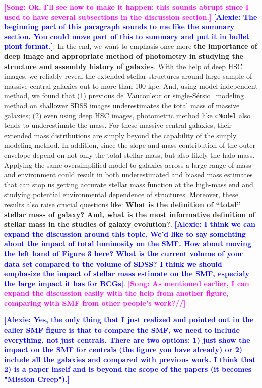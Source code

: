 \documentclass{emulateapj}
\def\ser{{S\'{e}rsic\ }}
\def\cmodel{\texttt{cModel}}
\newcommand{\song}[1]{\textcolor{magenta}{\textbf{[Song: #1]}}}
\newcommand{\alexie}[1]{\textcolor{blue}{\textbf{[Alexie: #1]}}}
\begin{document}
\begin{CJK*}{UTF8}{gbsn}
    \song{Ok, I'll see how to make it happen; this sounds abrupt since I used 
    to have several subsections in the discussion section.}
    \alexie{The beginning part of this paragraph sounds to me like the summary section. You could move part of this to summary and put it in bullet piont format.}. In the end, we want to emphasis once more \textbf{the importance of deep image 
    and appropriate method of photometry in studying the structure and assembly 
    history of galaxies}. 
    With the help of deep HSC images, we reliably reveal the extended stellar 
    structures around large sample of massive central galaxies out to more than 
    100 kpc.  
    And, using model-independent method, we found that 
    (1) previous de~Vaucouleur or single-\ser{} modeling method on shallower SDSS
    images underestimates the total mass of massive galaxies; 
    (2) even using deep HSC images, photometric method like \cmodel{} also tends 
    to underestimate the mass. 
    For these massive central galaxies, their extended mass distributions are 
    simply beyond the capability of the simply modeling method.  
    In addition, since the slope and mass contribution of the outer envelope 
    depend on not only the total stellar mass, but also likely the halo mass. 
    Applying the same oversimplified model to galaxies across a large range of 
    mass and environment could result in both underestimated and biased mass 
    estimates that can stop us getting accurate stellar mass function at the 
    high-mass end and studying potential environmental dependence of structures. 
    Moreover, these results also raise crucial questions like: 
    \textbf{What is the definition of ``total'' stellar mass of galaxy? 
    And, what is the most informative definition of stellar mass in the studies 
    of galaxy evolution?}.  \alexie{I think we can expand the discussion around this topic. We'd like to say somehting about the impact of total luminosity on the SMF. How about moving the left hand of Figure 3 here? What is the current volume of your data set compared to the volume of SDSS? I think we should emphasize the impact of stellar mass estimate on the SMF, especialy the large impact it has for BCGs}.
    \song{As mentioned earlier, I can expand the discussion easily with the help 
    from another figure, comparing with SMF from other people's work?//}
    
    \alexie{Yes, the only thing that I just realized and pointed out in the ealier SMF figure is that to compare the SMF, we need to include everything, not just centrals. There are two options: 1) just show the impact on the SMF for centrals (the figure you have already) or 2) include all the galaxies and compared with previous work. I think that 2) is a paper inself and is beyond the scope of the papers (it becomes "Mission Creep").}
    

\end{CJK*}
\end{document}
